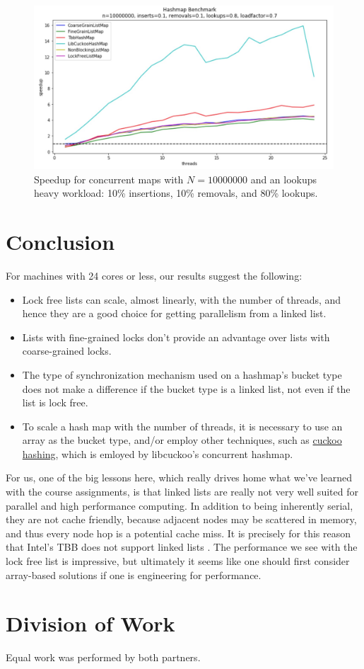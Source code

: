 \documentclass[11pt]{article}
\begin{document}
\begin{figure}[!htb]
\centering
\includegraphics[width=1.0\linewidth]{figs/patricio/latedays/lookups_heavy.jpg}
\caption{
Speedup for concurrent maps with $N=10000000$ and an lookups heavy workload:
10\% insertions, 10\% removals, and 80\% lookups.}
\label{fig:mapInsertHeavy}
\end{figure}

\section{Conclusion}
For machines with 24 cores or less, our results suggest the following:
\begin{itemize}
\item
Lock free lists can scale, almost linearly, with the number of threads, and
hence they are a good choice for getting parallelism from a linked list.
\item
Lists with fine-grained locks don't provide an advantage over lists with
coarse-grained locks.
\item
The type of synchronization mechanism used on a hashmap's bucket type does not
make a difference if the bucket type is a linked list, not even if the list is
lock free.
\item
To scale a hash map with the number of threads, it is necessary to use an array
as the bucket type, and/or employ other techniques, such as
\href{https://en.wikipedia.org/wiki/Cuckoo_hashing}{cuckoo hashing}, which is
emloyed by libcuckoo's concurrent hashmap.
\end{itemize}

For us, one of the big lessons here, which really drives home what we've learned
with the course assignments, is that linked lists are really not very well
suited for parallel and high performance computing. In addition to being
inherently serial, they are not cache friendly, because adjacent nodes may be
scattered in memory, and thus every node hop is a potential cache miss. It is
precisely for this reason that Intel's TBB does not support linked lists
\cite{tbbNoList}. The performance we see with the lock free list is impressive, but
ultimately it seems like one should first consider array-based solutions if one
is engineering for performance.

\section{Division of Work}
Equal work was performed by both partners.

\printbibliography
\end{document}
